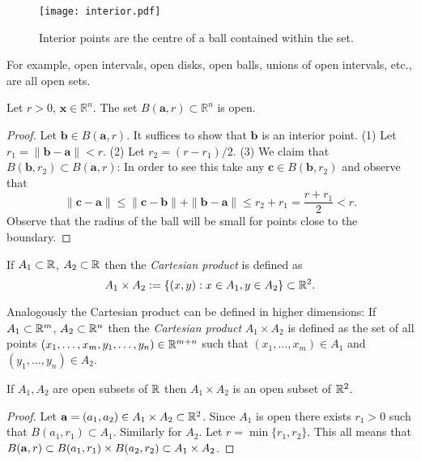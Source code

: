 \begin{figure}[htbp]
    \begin{center}
        \texttt{[image: interior.pdf]}
        \caption{Interior points are the centre of a ball contained within the set.}
    \end{center}
\end{figure}


For example,
open intervals, open disks, open balls, unions of open intervals, etc., are all open sets.

\begin{lemma*}
    Let $r>0$, $\mathbf{x} \in \mathbb{R}^n$. The set $B(\mathbf{a},r) \subset \mathbb{R}^n$ is open.
\end{lemma*}
\begin{proof}
    Let $\mathbf{b} \in B(\mathbf{a},r)$. It suffices to show that $\mathbf{b}$ is an interior point.
    (1) Let $r_1 = \| \mathbf{b} - \mathbf{a} \| < r$.
    (2) Let $r_2 = (r - r_1)/2$.
    (3) We claim that $B(\mathbf{b},r_2) \subset B(\mathbf{a},r)$:
    In order to see this take any $\mathbf{c} \in B(\mathbf{b},r_2)$ and observe that
    $$\| \mathbf{c} - \mathbf{a} \| \leq \| \mathbf{c} - \mathbf{b} \|  + \| \mathbf{b} - \mathbf{a} \| \leq r_2 + r_1 = \frac{r + r_1}{2} < r.$$
    Observe that the radius of the ball will be small for points close to the boundary.
\end{proof}



\begin{definition}
    If \(A_1 \subset \bR\), \(A_2 \subset \bR\) then the \emph{Cartesian product} is defined as
    \[
        A_1 \times A_2 := \left\{(x,y): x \in A_1, y \in A_2\right\}
        \subset \bR^{2}.
    \]
\end{definition}

Analogously the Cartesian product can be defined in higher dimensions:
If \(A_1 \subset \bR^m\), \(A_2 \subset \bR^n\) then the \emph{Cartesian product} \(A_1 \times A_2\) is defined as the set of all points \((x_1,\ldots,x_m,y_1,\ldots,y_n) \in \bR^{m+n}\) such that \((x_1,\ldots,x_m) \in A_1\) and \((y_1,\ldots,y_n) \in A_2\).


\begin{lemma*}
    If \(A_1, A_2\) are open subsets of \(\bR\) then \( A_1 \times A_2 \) is an open subset of \(\bR^2\).
\end{lemma*}
\begin{proof}
    Let \(\aa = (a_1,a_2) \in A_1\times A_2 \subset \bR^2\).
    Since  \(A_1\) is open there  exists \(r_1>0\) such that \(B(a_1,r_1)\subset A_1\).
    Similarly for \(A_2\).
    Let \(r=\min \{r_1,r_2\}\).
    This all means that \(B(\aa,r) \subset B(a_1,r_1) \times B(a_2,r_2) \subset A_1\times A_2\).
\end{proof}


